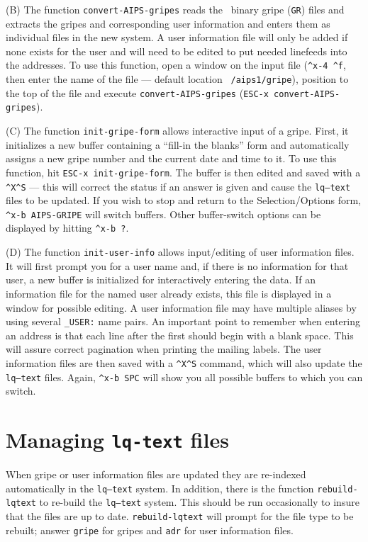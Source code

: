 (B) The function {\tt convert-AIPS-gripes} reads the \AIPS\ binary
gripe ({\tt GR}) files and extracts the gripes and corresponding user
information and enters them as individual files in the new system.
A user information file will only be added if none exists for the user
and will need to be edited to put needed linefeeds into the addresses.
To use this function, open a window on the input file ({\tt \^{ }x-4
\^{ }f}, then enter the name of the file --- default location {\tt
/aips1/gripe}), position to the top of the file and execute
{\tt convert-AIPS-gripes} ({\tt ESC-x convert-AIPS-gripes}).

(C) The function {\tt init-gripe-form} allows interactive input of a
gripe.  First, it initializes a new buffer containing a ``fill-in the
blanks'' form and automatically assigns a new gripe number and the
current date and time to it.  To use this function, hit {\tt ESC-x
init-gripe-form}. The buffer is then edited and saved with a {\tt
\^{ }X\^{ }S}  --- this will correct the status if an answer is given
and cause the {\tt lq--text} files to be updated. If you wish to stop
and return to the Selection/Options form, {\tt \^{ }x-b AIPS-GRIPE}
will switch buffers. Other buffer-switch options can be displayed by
hitting {\tt \^{ }x-b ?}.

(D) The function {\tt init-user-info} allows input/editing of user
information files.  It will first prompt you for a user name and, if
there is no information for that user, a new buffer is initialized for
interactively entering the data. If an information file for the named
user already exists, this file is displayed in a window for possible
editing.  A user information file may have multiple aliases by using
several {\tt \_USER:} name pairs.  An important point to remember when
entering an address is that each line after the first should begin
with a blank space.  This will assure correct pagination when printing
the mailing labels.  The user information files are then saved with a
{\tt \^{ }X\^{ }S} command, which will also update the {\tt lq--text}
files. Again, {\tt \^{ }x-b SPC} will show you all possible buffers to
which you can switch.

\section{Managing {\tt lq-text} files}

When gripe or user information files are updated they are re-indexed
automatically in the {\tt lq--text} system.  In addition, there is the
function {\tt rebuild-lqtext} to re-build the {\tt lq--text} system.
This should be run occasionally to insure that the files are up to
date.  {\tt rebuild-lqtext} will prompt for the file type to be
rebuilt; answer {\tt gripe} for gripes and {\tt adr} for user
information files.

